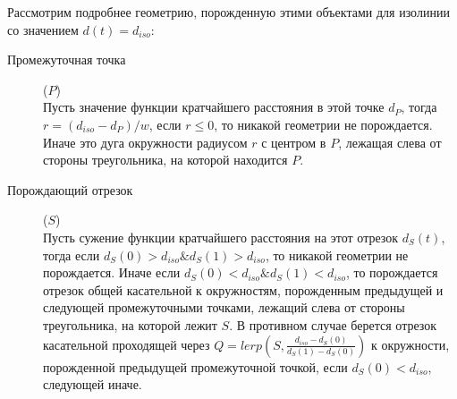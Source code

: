 Рассмотрим подробнее геометрию, порожденную этими объектами для
изолинии со значением $d(t) = d_{iso}$:
\begin{description}
\item[Промежуточная точка] ($P$) \\
Пусть значение функции кратчайшего расстояния в этой точке $d_P$, тогда
$r = (d_{iso} - d_P)/w$, если $r \leq 0$, то никакой геометрии не порождается.
Иначе это дуга окружности радиусом $r$ с центром в $P$, лежащая слева от
стороны треугольника, на которой находится $P$.
\item[Порождающий отрезок] ($S$) \\
Пусть сужение функции кратчайшего расстояния на этот отрезок $d_S(t)$, тогда
если $d_S(0) > d_{iso} \& d_S(1) > d_{iso}$, то никакой геометрии не порождается.
Иначе если $d_S(0) < d_{iso} \& d_S(1) < d_{iso}$, то порождается отрезок общей
касательной к окружностям, порожденным предыдущей и следующей промежуточными
точками, лежащий слева от стороны треугольника, на которой лежит $S$.
В противном случае берется отрезок касательной проходящей через
$Q = lerp(S, \frac{d_{iso}-d_S(0)}{d_S(1) - d_S(0)})$ к окружности, порожденной
предыдущей промежуточной точкой, если $d_S(0) < d_{iso}$, следующей иначе.
\end{description}
